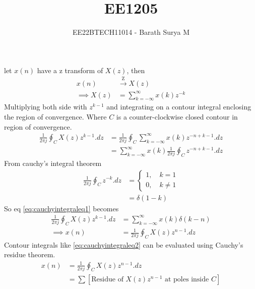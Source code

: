 \documentclass[journal,12pt,onecolumn]{IEEEtran}
\theoremstyle{remark}
\providecommand{\sbrak}[1]{\ensuremath{{}\left[#1\right]}}
\providecommand{\brak}[1]{\ensuremath{\left(#1\right)}}
\begin{document}

\vspace{3cm}

\title{EE1205}
\author{EE22BTECH11014 - Barath Surya M}
\maketitle
let $x\brak{n}$ have a z transform of $X\brak{z}$, then
\begin{align}
    x\brak{n}          & \xrightarrow{\text{Z}} X\brak{z}             \\
    \implies X\brak{z} & = \sum_{k=-\infty}^{\infty} x\brak{k} z^{-k}
\end{align}
Multiplying both side with $z^{k-1}$ and integrating on a contour integral enclosing the region of convergence. Where $C$ is a counter-clockwise closed contour in region of convergence.
\begin{align}
    \frac{1}{2\pi j} \oint_C X\brak{z} z^{k-1} .dz & = \frac{1}{2\pi j} \oint_C \sum_{k=-\infty}^{\infty} x\brak{k} z^{-n+k-1} .dz                              \\
                                                   & =\sum_{k=-\infty}^{\infty} x\brak{k}  \frac{1}{2\pi j} \oint_C z^{-n+k-1} .dz \label{eq:cauchyintegraleq1}
\end{align}
From cauchy's integral theorem
\begin{align}
    \frac{1}{2\pi j} \oint_C z^{-k} .dz & = \begin{cases}
                                                1, \quad k = 1 \\
                                                0, \quad k\neq 1
                                            \end{cases}  \\
                                        & = \delta\brak{1-k}
\end{align}
So eq \eqref{eq:cauchyintegraleq1} becomes
\begin{align}
    \frac{1}{2\pi j} \oint_C X\brak{z} z^{k-1} .dz & = \sum_{k=-\infty}^{\infty} x\brak{k} \delta \brak{k-n}                        \\
    \implies x\brak{n}                             & =  \frac{1}{2\pi j} \oint_C X\brak{z} z^{n-1} .dz \label{eq:cauchyintegraleq2}
\end{align}
Contour integrals like \eqref{eq:cauchyintegraleq2} can be evaluated using Cauchy's residue theorem.
\begin{align}
    x\brak{n} & =  \frac{1}{2\pi j} \oint_C X\brak{z} z^{n-1} .dz                              \\
              & = \sum \sbrak{\text{Residue of } X\brak{z} z^{n-1} \text{ at poles inside } C}
\end{align}
\end{document}
